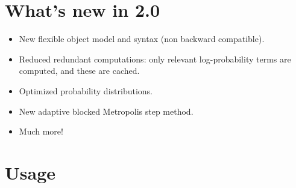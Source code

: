 
\hypertarget{what-s-new-in-2-0}{}
\section*{What's new in 2.0}
\begin{itemize}
\item {} 
New flexible object model and syntax (non backward compatible).

\item {} 
Reduced redundant computations: only relevant log-probability terms are 
computed, and these are cached.

\item {} 
Optimized probability distributions.

\item {} 
New adaptive blocked Metropolis step method.

\item {} 
Much more!

\end{itemize}



\hypertarget{usage}{}
\section*{Usage}

